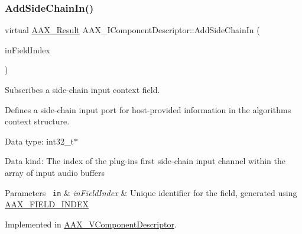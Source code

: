 \subsubsection{\texorpdfstring{AddSideChainIn()}{AddSideChainIn()}}
{\footnotesize\ttfamily virtual \mbox{\hyperlink{a00392_a4d8f69a697df7f70c3a8e9b8ee130d2f}{A\+A\+X\+\_\+\+Result}} A\+A\+X\+\_\+\+I\+Component\+Descriptor\+::\+Add\+Side\+Chain\+In (\begin{DoxyParamCaption}\item[{\mbox{\hyperlink{a00392_ae807f8986143820cfb5d6da32165c9c7}{A\+A\+X\+\_\+\+C\+Field\+Index}}}]{in\+Field\+Index }\end{DoxyParamCaption})\hspace{0.3cm}{\ttfamily [pure virtual]}}



Subscribes a side-\/chain input context field. 

Defines a side-\/chain input port for host-\/provided information in the algorithm\textquotesingle{}s context structure.


\begin{DoxyItemize}
\item Data type\+: int32\+\_\+t$\ast$
\item Data kind\+: The index of the plug-\/in\textquotesingle{}s first side-\/chain input channel within the array of input audio buffers
\end{DoxyItemize}


\begin{DoxyParams}[1]{Parameters}
\mbox{\texttt{ in}}  & {\em in\+Field\+Index} & Unique identifier for the field, generated using \mbox{\hyperlink{a00392_acf807247ecd6e5899dc9dc31644e9a1d}{A\+A\+X\+\_\+\+F\+I\+E\+L\+D\+\_\+\+I\+N\+D\+EX}} \\
\hline
\end{DoxyParams}


Implemented in \mbox{\hyperlink{a01901_a9d3ad428d0b423e4aabba60eb76655c7}{A\+A\+X\+\_\+\+V\+Component\+Descriptor}}.

\mbox{\label{a01781_a230293b9f6bb413626cd487ca501df75}} 
